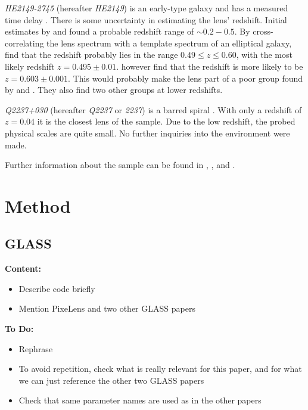 \documentclass[useAMS,usenatbib]{mn2e}
\begin{document}
\textit{HE2149-2745} (hereafter \textit{HE2149}) is an early-type galaxy \citep{2007A&A...465...51E} and has a measured time delay \citep{2002A&A...383...71B}. There is some uncertainty in estimating the lens' redshift. Initial estimates by \cite{1996A&A...315L.405W} and \cite{2000ApJ...543..131K} found a probable redshift range of $\sim0.2-0.5$. By cross-correlating the lens spectrum with a template spectrum of an elliptical galaxy, \cite{2002A&A...383...71B} find that the redshift probably lies in the range $0.49\leq z \leq 0.60$, with the most likely redshift $z=0.495\pm0.01$. \cite{2007A&A...465...51E} however find that the redshift is more likely to be $z=0.603\pm0.001$. This would probably make the lens part of a poor group found by \cite{2006ApJ...641..169M} and \cite{2006ApJ...646...85W}. They also find two other groups at lower redshifts.

\textit{Q2237+030} (hereafter \textit{Q2237} or \textit{2237}) is a barred spiral \citep{1988AJ.....95.1331Y}. With only a redshift of $z=0.04$ it is the closest lens of the sample. Due to the low redshift, the probed physical scales are quite small. No further inquiries into the environment were made.

Further information about the sample can be found in \cite{leier11phd}, \cite{2011ApJ...740...97L}, and \cite{2012A&A...538A..99S}.


\section{Method}\label{sec:method}
\subsection{GLASS}
\textbf{Content:}
\begin{itemize}
\item Describe code briefly
\item Mention PixeLens and two other GLASS papers
\end{itemize}

\textbf{To Do:}
\begin{itemize}
\item Rephrase
\item To avoid repetition, check what is really relevant for this paper, and for what we can just reference the other two GLASS papers
\item Check that same parameter names are used as in the other papers
\end{itemize}
\end{document}

